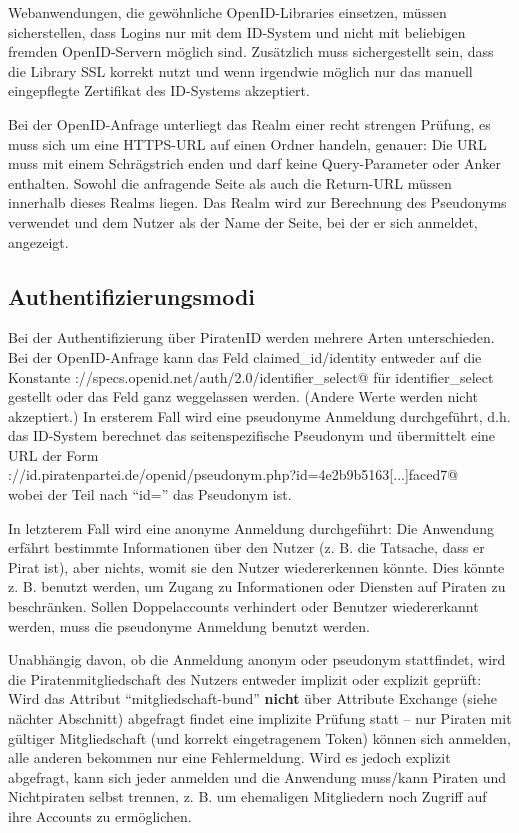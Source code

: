Webanwendungen, die gewöhnliche OpenID-Libraries einsetzen, müssen sicherstellen, dass Logins nur mit dem ID-System und nicht mit beliebigen fremden OpenID-Servern möglich sind.
Zusätzlich muss sichergestellt sein, dass die Library SSL korrekt nutzt und wenn irgendwie möglich nur das manuell eingepflegte Zertifikat des ID-Systems akzeptiert.

Bei der OpenID-Anfrage unterliegt das Realm einer recht strengen Prüfung, es muss sich um eine HTTPS-URL auf einen Ordner handeln, genauer:
Die URL muss mit einem Schrägstrich enden und darf keine Query-Parameter oder Anker enthalten.
Sowohl die anfragende Seite als auch die Return-URL müssen innerhalb dieses Realms liegen.
Das Realm wird zur Berechnung des Pseudonyms verwendet und dem Nutzer als der Name der Seite, bei der er sich anmeldet, angezeigt.


\subsection{Authentifizierungsmodi}
Bei der Authentifizierung über PiratenID werden mehrere Arten unterschieden.
Bei der OpenID-Anfrage kann das Feld claimed\_id/identity entweder auf die Konstante \verb@http://specs.openid.net/auth/2.0/identifier\_select@
für identifier\_select gestellt oder das Feld ganz weggelassen werden. (Andere Werte werden nicht akzeptiert.)
In ersterem Fall wird eine pseudonyme Anmeldung durchgeführt, d.h. das ID-System berechnet das seitenspezifische Pseudonym und übermittelt eine URL der Form\\
\verb@https://id.piratenpartei.de/openid/pseudonym.php?id=4e2b9b5163[...]faced7@\\
wobei der Teil nach "`id="' das Pseudonym ist.

In letzterem Fall wird eine anonyme Anmeldung durchgeführt:
Die Anwendung erfährt bestimmte Informationen über den Nutzer (z. B. die Tatsache, dass er Pirat ist), aber nichts, womit sie den Nutzer wiedererkennen könnte.
Dies könnte z. B. benutzt werden, um Zugang zu Informationen oder Diensten auf Piraten zu beschränken.
Sollen Doppelaccounts verhindert oder Benutzer wiedererkannt werden, muss die pseudonyme Anmeldung benutzt werden.

Unabhängig davon, ob die Anmeldung anonym oder pseudonym stattfindet, wird die Piratenmitgliedschaft des Nutzers entweder implizit oder explizit geprüft:
Wird das Attribut "`mitgliedschaft-bund"' \textbf{nicht} über Attribute Exchange (siehe nächter Abschnitt) abgefragt findet eine implizite Prüfung statt -- 
nur Piraten mit gültiger Mitgliedschaft (und korrekt eingetragenem Token) können sich anmelden, alle anderen bekommen nur eine Fehlermeldung.
Wird es jedoch explizit abgefragt, kann sich jeder anmelden und die Anwendung muss/kann Piraten und Nichtpiraten selbst trennen,
z. B. um ehemaligen Mitgliedern noch Zugriff auf ihre Accounts zu ermöglichen.


